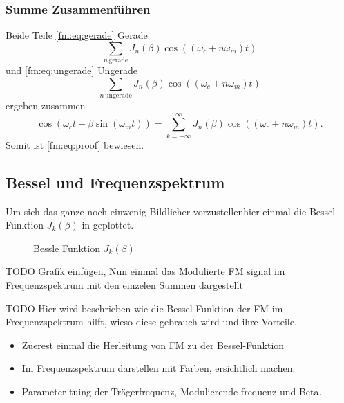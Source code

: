 \subsubsection{Summe Zusammenführen}
Beide Teile \eqref{fm:eq:gerade} Gerade 
\[
    \sum_{n\, \text{gerade}} J_{n}(\beta) \cos((\omega_c + n\omega_m) t)
\]
und \eqref{fm:eq:ungerade} Ungerade 
\[
    \sum_{n\, \text{ungerade}} J_{n}(\beta) \cos((\omega_c + n\omega_m) t)
\]
ergeben zusammen
\[
    \cos(\omega_ct+\beta\sin(\omega_mt))
    =
    \sum_{k= -\infty}^\infty J_{n}(\beta) \cos((\omega_c+ n\omega_m)t).
\]
Somit ist \eqref{fm:eq:proof} bewiesen.
\newpage
\subsection{Bessel und Frequenzspektrum}
Um sich das ganze noch einwenig Bildlicher vorzustellenhier einmal die Bessel-Funktion \(J_{k}(\beta)\) in geplottet.
\begin{figure}
	\centering
	
	\caption{Bessle Funktion \(J_{k}(\beta)\)}
	\label{fig:bessel}
\end{figure}
TODO Grafik einfügen,
\newline
Nun einmal das Modulierte FM signal im Frequenzspektrum mit den einzelen Summen dargestellt

TODO
Hier wird beschrieben wie die Bessel Funktion der FM im Frequenzspektrum hilft, wieso diese gebrauch wird und ihre Vorteile.
\begin{itemize}
    \item Zuerest einmal die Herleitung von FM zu der Bessel-Funktion
    \item Im Frequenzspektrum darstellen mit Farben, ersichtlich machen. 
    \item Parameter tuing der Trägerfrequenz, Modulierende frequenz und Beta. 
\end{itemize}





